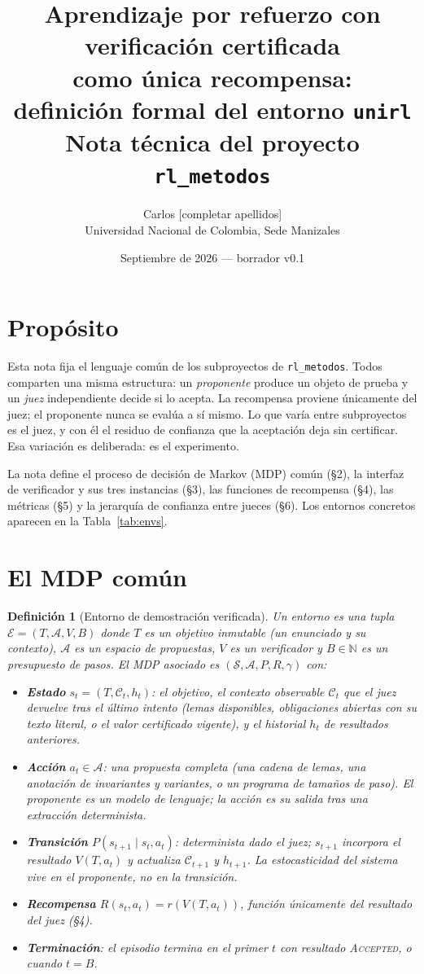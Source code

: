 \documentclass[11pt,a4paper]{article}
\title{Aprendizaje por refuerzo con verificación certificada\\como única recompensa:\\definición formal del entorno \texttt{unirl}\\[0.4em]\large Nota técnica del proyecto \texttt{rl\_metodos}}
\author{Carlos [completar apellidos]\\Universidad Nacional de Colombia, Sede Manizales}
\date{Septiembre de 2026 --- borrador v0.1}
\newtheorem{definition}{Definición}
\begin{document}
\maketitle

\section{Propósito}

Esta nota fija el lenguaje común de los subproyectos de \texttt{rl\_metodos}. Todos comparten una misma estructura: un \emph{proponente} produce un objeto de prueba y un \emph{juez} independiente decide si lo acepta. La recompensa proviene únicamente del juez; el proponente nunca se evalúa a sí mismo. Lo que varía entre subproyectos es el juez, y con él el residuo de confianza que la aceptación deja sin certificar. Esa variación es deliberada: es el experimento.

La nota define el proceso de decisión de Markov (MDP) común (§2), la interfaz de verificador y sus tres instancias (§3), las funciones de recompensa (§4), las métricas (§5) y la jerarquía de confianza entre jueces (§6). Los entornos concretos aparecen en la Tabla~\ref{tab:envs}.

\section{El MDP común}

\begin{definition}[Entorno de demostración verificada]
Un entorno es una tupla $\mathcal{E} = (T, \mathcal{A}, V, B)$ donde $T$ es un \emph{objetivo} inmutable (un enunciado y su contexto), $\mathcal{A}$ es un espacio de \emph{propuestas}, $V$ es un \emph{verificador} y $B \in \mathbb{N}$ es un presupuesto de pasos. El MDP asociado es $(\mathcal{S}, \mathcal{A}, P, R, \gamma)$ con:
\begin{itemize}
  \item \textbf{Estado} $s_t = (T, \mathcal{C}_t, h_t)$: el objetivo, el \emph{contexto observable} $\mathcal{C}_t$ que el juez devuelve tras el último intento (lemas disponibles, obligaciones abiertas con su texto literal, o el valor certificado vigente), y el historial $h_t$ de resultados anteriores.
  \item \textbf{Acción} $a_t \in \mathcal{A}$: una propuesta completa (una cadena de lemas, una anotación de invariantes y variantes, o un programa de tamaños de paso). El proponente es un modelo de lenguaje; la acción es su salida tras una extracción determinista.
  \item \textbf{Transición} $P(s_{t+1} \mid s_t, a_t)$: determinista dado el juez; $s_{t+1}$ incorpora el resultado $V(T, a_t)$ y actualiza $\mathcal{C}_{t+1}$ y $h_{t+1}$. La estocasticidad del sistema vive en el proponente, no en la transición.
  \item \textbf{Recompensa} $R(s_t, a_t) = r(V(T, a_t))$, función únicamente del resultado del juez (§4).
  \item \textbf{Terminación}: el episodio termina en el primer $t$ con resultado \textsc{Accepted}, o cuando $t = B$.
\end{itemize}
\end{definition}
\end{document}
